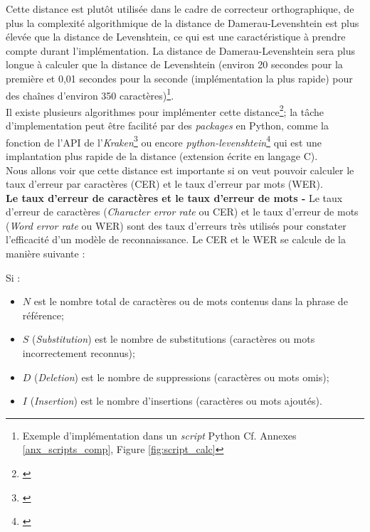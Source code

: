 Cette distance est plutôt utilisée dans le cadre de correcteur orthographique, de plus la complexité algorithmique de la distance de Damerau-Levenshtein est plus élevée que la distance de Levenshtein, ce qui est une caractéristique à prendre compte durant l'implémentation. La distance de Damerau-Levenshtein sera plus longue à calculer que la distance de Levenshtein (environ 20 secondes pour la première et 0,01 secondes pour la seconde (implémentation la plus rapide) pour des chaînes d'environ 350 caractères)\footnote{Exemple d'implémentation dans un \textit{script} Python Cf. Annexes \ref{anx_scripts_comp}, Figure \ref{fig:script_calc}}.\\

Il existe plusieurs algorithmes pour implémenter cette distance\footnote{\cite{wikibooks_algorithm_2020}}; la tâche d'implementation peut être facilité par des \textit{packages} en Python, comme la fonction  de l'API de l'\textit{Kraken}\footnote{\cite{noauthor_kraken_nodate}} ou encore  \textit{python-levenshtein}\footnote{\cite{noauthor_python-levenshtein_nodate}} qui est une implantation plus rapide de la distance (extension écrite en langage C).\\

Nous allons voir que cette distance est importante si on veut pouvoir calculer le taux d'erreur par caractères (CER) et le taux d'erreur par mots (WER).\\ 

\textbf{Le taux d'erreur de caractères et le taux d'erreur de mots -} Le taux d'erreur de caractères (\textit{Character error rate} ou CER) et le taux d'erreur de mots (\textit{Word error rate} ou WER) sont des taux d'erreurs très utilisés pour constater l'efficacité d'un modèle de reconnaissance. Le CER et le WER se calcule de la manière suivante :

Si : 

\begin{itemize}
    \item $N$ est le nombre total de caractères ou de mots contenus dans la phrase de référence;
    \item $S$ (\textit{Substitution}) est le nombre de substitutions (caractères ou mots incorrectement reconnus);
    \item $D$ (\textit{Deletion}) est le nombre de suppressions (caractères ou mots omis);
    \item $I$ (\textit{Insertion}) est le nombre d'insertions (caractères ou mots ajoutés).
\end{itemize}

